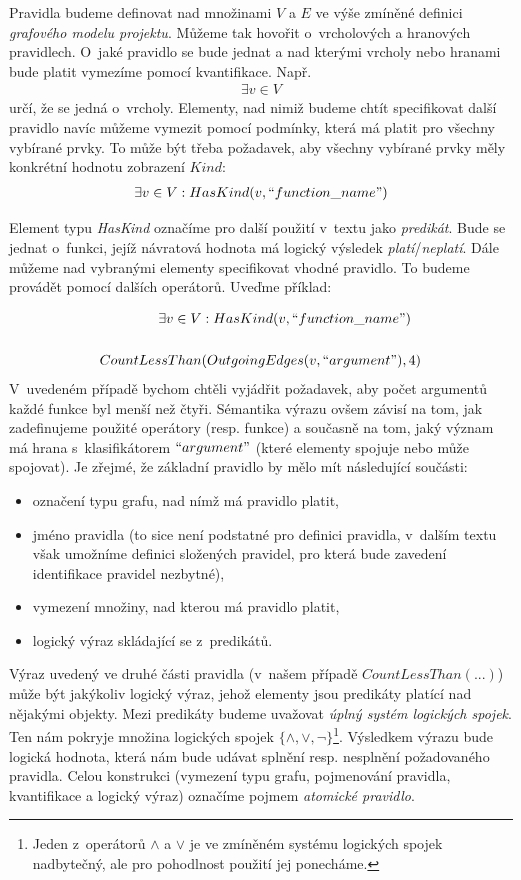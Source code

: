 Pravidla budeme definovat nad množinami $V$ a $E$ ve výše zmíněné definici \emph{grafového modelu projektu}. Můžeme tak hovořit o~vrcholových a hranových pravidlech. O~jaké pravidlo se bude jednat a nad kterými vrcholy nebo hranami bude platit vymezíme pomocí kvantifikace. Např.
\begin{align*}
\exists v \in
V \end{align*}
určí, že se jedná o~vrcholy. Elementy, nad nimiž budeme chtít specifikovat další pravidlo navíc můžeme vymezit pomocí podmínky, která má platit pro všechny vybírané prvky. To může být třeba požadavek, aby všechny vybírané prvky měly konkrétní hodnotu zobrazení $Kind$:
\begin{align*}
\exists v \in V : HasKind(v, ``function\_name")
\end{align*}

Element typu \emph{HasKind} označíme pro další použití v~textu jako \emph{predikát}. Bude se jednat o~funkci, jejíž návratová hodnota má logický výsledek \emph{platí}/\emph{neplatí}. Dále můžeme nad vybranými elementy specifikovat vhodné pravidlo. To budeme provádět pomocí dalších operátorů. Uveďme příklad:

\begin{align*}
\exists v \in V &: HasKind(v, ``function\_name") \\
\\
CountLessThan&(OutgoingEdges(v, ``argument"), 4)
\end{align*}
V~uvedeném případě bychom chtěli vyjádřit požadavek, aby počet argumentů každé funkce byl menší než čtyři. Sémantika výrazu ovšem závisí na tom, jak zadefinujeme použité operátory (resp. funkce) a současně na tom, jaký význam má hrana s~klasifikátorem $``argument"$ (které elementy spojuje nebo může spojovat). Je zřejmé, že základní pravidlo by mělo mít následující součásti:

\begin{itemize}
\item označení typu grafu, nad nímž má pravidlo platit,
\item jméno pravidla (to sice není podstatné pro definici pravidla, v~dalším textu však umožníme definici složených pravidel, pro která bude zavedení identifikace pravidel nezbytné),
\item vymezení množiny, nad kterou má pravidlo platit,
\item logický výraz skládající se z~predikátů.
\end{itemize}

Výraz uvedený ve druhé části pravidla (v~našem případě $CountLessThan(...)$) může být jakýkoliv logický výraz, jehož elementy jsou predikáty platící nad nějakými objekty. Mezi predikáty budeme uvažovat \emph{úplný systém logických spojek}. Ten nám pokryje množina logických spojek $\{\wedge, \vee, \neg\}$\footnote{Jeden z~operátorů $\wedge$ a $\vee$ je ve zmíněném systému logických spojek nadbytečný, ale pro pohodlnost použití jej ponecháme.}. Výsledkem výrazu bude logická hodnota, která nám bude udávat splnění resp. nesplnění požadovaného pravidla. Celou konstrukci (vymezení typu grafu, pojmenování pravidla, kvantifikace a logický výraz) označíme pojmem \emph{atomické pravidlo}.

